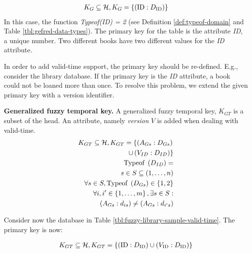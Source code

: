 \begin{align}
\nonumber
K_G \subseteq \mathcal{H}, K_G = \left \lbrace  \left(\text{ID}:D_{\text{ID}} \right) \right \rbrace
\end{align}
In this case, the function \emph{Typeof(ID) = 2} (see Definition \ref{def:typeof-domain} and Table \ref{tbl:gefred-data-types}). The primary key for the table is the attribute \emph{ID}, a unique number. Two different books have two different values for the \emph{ID} attribute.

In order to add valid-time support, the primary key should be re-defined. E.g., consider the library database. If the primary key is the \emph{ID} attribute, a book could not be loaned more than once. To resolve this problem, we extend the given primary key with a version identifier. 



\begin{definition}
\label{def:generalized-fuzzy-temporal-key}
\textbf{Generalized fuzzy temporal key.}
A generalized fuzzy temporal key, $K_{GT}$ is a subset of the head. An attribute, namely \emph{version} $V$ is added when dealing with valid-time.
\begin{align}
\label{eq:generalized-fuzzy-temporal-key}
K_{GT} \subseteq \mathcal{H}, K_{GT} = \left \lbrace  \left(A_{Gs}:D_{Gs} \right) \right.  \\
\nonumber
 \left. \cup  \left(V_{ID}:D_{ID} \right)	\right \rbrace \\
\nonumber
\text{Typeof }\left(D_{ID} \right) = \\
\nonumber
s\in S \subseteq \left(1, \ldots, n \right) \\
\nonumber
\forall s \in S, \text{Typeof } \left(D_{Gs} \right) \in \left \lbrace 1, 2 \right \rbrace \\
\nonumber
\forall i, i' \in \left \lbrace 1, \ldots, m\right \rbrace , \exists s \in S: \\
\nonumber
\left(A_{Gs}:d_{is} \right) \neq \left(A_{Gs}:d_{i's} \right)
\end{align}
\end{definition}

Consider now the database in Table \ref{tbl:fuzzy-library-sample-valid-time}. The primary key is now:

\begin{align}
 \nonumber
K_{GT} \subseteq \mathcal{H}, K_{GT} = \left \lbrace  \left(\text{ID}:D_{\text{ID}} \right) \cup  \left(V_{\text{ID}}:D_{\text{ID}} \right) \right \rbrace	
\end{align}


